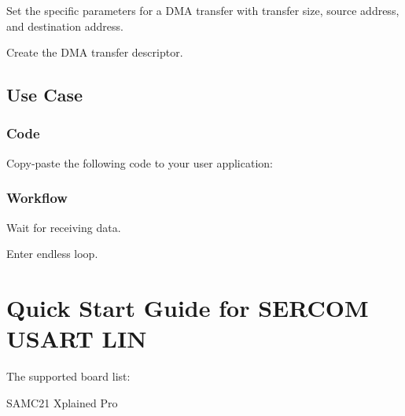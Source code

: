 \begin{DoxyEnumerate}
\item Set the specific parameters for a D\+MA transfer with transfer size, source address, and destination address. 
\begin{DoxyCodeInclude}{0}
\end{DoxyCodeInclude}

\item Create the D\+MA transfer descriptor. 
\begin{DoxyCodeInclude}{0}
\end{DoxyCodeInclude}
 
\end{DoxyEnumerate}\hypertarget{asfdoc_sam0_sercom_usart_dma_use_case_asfdoc_sam0_usart_dma_use_case_main}{}\subsection{Use Case}\label{asfdoc_sam0_sercom_usart_dma_use_case_asfdoc_sam0_usart_dma_use_case_main}
\hypertarget{asfdoc_sam0_sercom_usart_dma_use_case_asfdoc_sam0_usart_dma_use_case_main_code}{}\subsubsection{Code}\label{asfdoc_sam0_sercom_usart_dma_use_case_asfdoc_sam0_usart_dma_use_case_main_code}
Copy-\/paste the following code to your user application\+: 
\begin{DoxyCodeInclude}{0}
\end{DoxyCodeInclude}
 \hypertarget{asfdoc_sam0_sercom_usart_dma_use_case_asfdoc_sam0_usart_dma_use_case_main_flow}{}\subsubsection{Workflow}\label{asfdoc_sam0_sercom_usart_dma_use_case_asfdoc_sam0_usart_dma_use_case_main_flow}

\begin{DoxyEnumerate}
\item Wait for receiving data. 
\begin{DoxyCodeInclude}{0}
\end{DoxyCodeInclude}

\item Enter endless loop. 
\begin{DoxyCodeInclude}{0}
\end{DoxyCodeInclude}

\end{DoxyEnumerate}\hypertarget{asfdoc_sam0_sercom_usart_lin_use_case}{}\section{Quick Start Guide for S\+E\+R\+C\+OM U\+S\+A\+RT L\+IN}\label{asfdoc_sam0_sercom_usart_lin_use_case}
The supported board list\+:
\begin{DoxyItemize}
\item S\+A\+M\+C21 Xplained Pro
\end{DoxyItemize}


